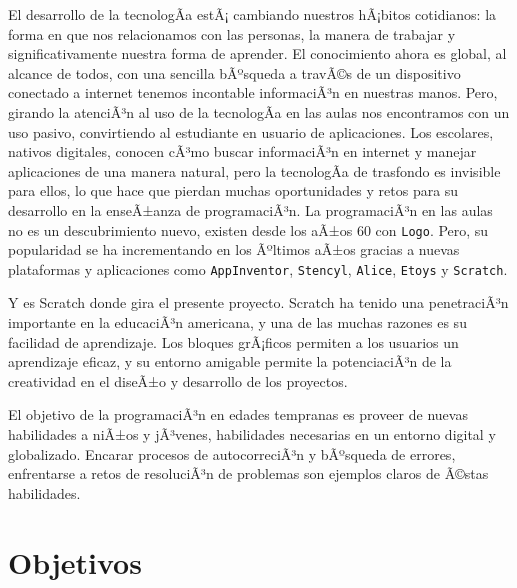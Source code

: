 \documentclass[a4paper, 12pt]{book}
\begin{document}
El desarrollo de la tecnologÃ­a estÃ¡ cambiando nuestros hÃ¡bitos cotidianos: la forma
en que nos relacionamos con las personas, la manera de trabajar y significativamente
nuestra forma de aprender. El conocimiento ahora es global, al alcance de todos, con
una sencilla bÃºsqueda a travÃ©s de un dispositivo conectado a internet tenemos incontable
informaciÃ³n en nuestras manos. Pero, girando la atenciÃ³n al uso de la tecnologÃ­a en las 
aulas nos encontramos con un uso pasivo, convirtiendo al estudiante en usuario de 
aplicaciones. Los escolares, nativos digitales, conocen cÃ³mo buscar informaciÃ³n en internet 
y manejar aplicaciones de una manera natural, pero la tecnologÃ­a de trasfondo es invisible 
para ellos, lo que hace que pierdan muchas oportunidades y retos para su desarrollo en la
enseÃ±anza de programaciÃ³n.
La programaciÃ³n en las aulas no es un descubrimiento nuevo, existen desde los aÃ±os 60  con \texttt{Logo}. 
Pero, su popularidad se ha incrementando en los Ãºltimos aÃ±os gracias a nuevas plataformas y aplicaciones
como \texttt{AppInventor}, \texttt{Stencyl}, \texttt{Alice}, \texttt{Etoys} y \texttt{Scratch}.

Y es Scratch donde gira el presente proyecto. Scratch ha tenido una penetraciÃ³n importante 
en la educaciÃ³n americana, y una de las muchas razones es su facilidad de aprendizaje. Los
bloques grÃ¡ficos permiten a los usuarios un aprendizaje eficaz, y su entorno amigable permite 
la potenciaciÃ³n de la creatividad en el diseÃ±o y desarrollo de los proyectos.

El objetivo de la programaciÃ³n en edades tempranas es proveer de nuevas habilidades a niÃ±os y
jÃ³venes, habilidades necesarias en un entorno digital y globalizado. Encarar procesos de
autocorreciÃ³n y bÃºsqueda de errores, enfrentarse a retos de resoluciÃ³n de problemas son ejemplos
claros de Ã©stas habilidades.








\cleardoublepage
\chapter{Objetivos}
\label{chap:objetivos}
\end{document}
